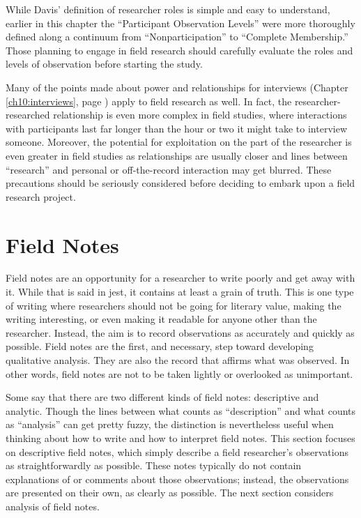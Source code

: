 While Davis' definition of researcher roles is simple and easy to understand, earlier in this chapter the ``Participant Observation Levels'' were more thoroughly defined along a continuum from ``Nonparticipation'' to ``Complete Membership.'' Those planning to engage in field research should carefully evaluate the roles and levels of observation before starting the study.

Many of the points made about power and relationships for interviews (Chapter \ref{ch10:interviews}, page \pageref{ch10:interviews}) apply to field research as well. In fact, the researcher-researched relationship is even more complex in field studies, where interactions with participants last far longer than the hour or two it might take to interview someone. Moreover, the potential for exploitation on the part of the researcher is even greater in field studies as relationships are usually closer and lines between ``research'' and personal or off-the-record interaction may get blurred. These precautions should be seriously considered before deciding to embark upon a field research project.

\section{Field Notes}

Field notes are an opportunity for a researcher to write poorly and get away with it. While that is said in jest, it contains at least a grain of truth. This is one type of writing where researchers should not be going for literary value, making the writing interesting, or even making it readable for anyone other than the researcher. Instead, the aim is to record observations as accurately and quickly as possible. Field notes are the first, and necessary, step toward developing qualitative analysis. They are also the record that affirms what was observed. In other words, field notes are not to be taken lightly or overlooked as unimportant.

Some say that there are two different kinds of field notes: descriptive and analytic. Though the lines between what counts as ``description'' and what counts as ``analysis'' can get pretty fuzzy, the distinction is nevertheless useful when thinking about how to write and how to interpret field notes. This section focuses on descriptive field notes, which simply describe a field researcher's observations as straightforwardly as possible. These notes typically do not contain explanations of or comments about those observations; instead, the observations are presented on their own, as clearly as possible. The next section considers analysis of field notes.

